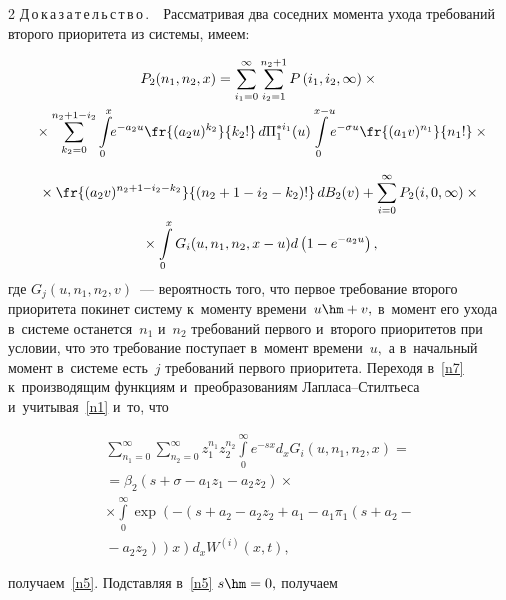 \begin{multicols}{2}
\noindent
Д\,о\,к\,а\,з\,а\,т\,е\,л\,ь\,с\,т\,в\,о\,.\ \
Рассматривая два соседних момента ухода требований второго
 приоритета из системы, имеем:
 
 \vspace*{-6pt}
 
 \noindent
\begin{multline*}
P_2(n_1,n_2,x)=\sum\limits_{i_1=0}^{\infty}
\sum\limits_{i_2=1}^{n_2+1}P\left(i_1,i_2,\infty\right)\times{}\\[-1pt]
{}\times \sum\limits_{k_2=0}^{n_2+1-i_2}
\int\limits_0^x \!\! e^{-a_2u}\fr{(a_2u)^{k_2}}{k_2!}\,
d\Pi_1^{*i_1}(u)\!\int\limits_0^{x-u}  \!\!e^{-\sigma u}\fr{(a_1v)^{n_1}}{n_1!}
\times{}\hspace*{-3.60439pt}
\end{multline*}

\noindent
\begin{multline}
{}\times\fr{(a_2v)^{n_2+1-i_2-k_2}}{(n_2+1-i_2-k_2)!}\,dB_2(v)+
\sum\limits_{i=0}^{\infty}P_2(i,0,\infty)\times{}\\
{}\times
\int\limits_0^xG_i(u,n_1,n_2,x-u)d\left(1-e^{-a_2u}\right),
\label{n7}
\end{multline}
где
$G_j(u,n_1,n_2,v)$~--- вероятность того, что первое требование второго 
приоритета покинет систему к~моменту времени~$u\hm+v,$
в~момент его ухода в~системе останется~$n_1$ и~$n_2$ требований первого и~второго 
приоритетов при условии, что это требование поступает
в~момент времени~$u,$ а в~начальный момент
в~системе есть~$j$  требований первого приоритета.  Переходя 
в~\eqref{n7} к~производящим функциям и~преобразованиям Лап\-ла\-са--Стилть\-еса 
и~учитывая~\eqref{n1} и~то, что

\vspace*{-3pt}

\noindent
\begin{multline*}
\sum\limits_{n_1=0}^{\infty}\sum\limits_{n_2=0}^{\infty}
z_1^{n_1}z_2^{n_2}\int\limits_0^{\infty}e^{-sx}
d_xG_i(u,n_1,n_2,x)={}\\
{}=\beta_2(s+\sigma-a_1z_1-a_2z_2)\times\\
\times \int\limits_0^{\infty}\!
\exp\left(-\left(s+a_2-a_2z_2+a_1-a_1\pi_1\left(s+a_2-{}\right.\right.\right.\\
\left.\left.\left.{}-a_2z_2\right)\right)x\right)
d_x W^{(i)}(x,t),
\end{multline*}

\vspace*{-3pt}

\noindent
получаем~\eqref{n5}. Подставляя в~\eqref{n5} $s\hm=0,$ получаем


\end{multicols}
